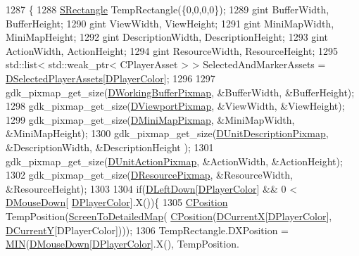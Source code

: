 \begin{DoxyCode}
1287                                      \{
1288     \hyperlink{structSRectangle}{SRectangle} TempRectangle(\{0,0,0,0\});
1289     gint BufferWidth, BufferHeight;
1290     gint ViewWidth, ViewHeight;
1291     gint MiniMapWidth, MiniMapHeight;
1292     gint DescriptionWidth, DescriptionHeight;
1293     gint ActionWidth, ActionHeight;
1294     gint ResourceWidth, ResourceHeight;
1295     std::list< std::weak\_ptr< CPlayerAsset > > SelectedAndMarkerAssets = 
      \hyperlink{classCApplicationData_a05c1087d5a5c4ddc14fcb37444f1642b}{DSelectedPlayerAssets}[\hyperlink{classCApplicationData_a53550939b20cba70570f113e4d1c5d02}{DPlayerColor}];
1296 
1297     gdk\_pixmap\_get\_size(\hyperlink{classCApplicationData_afa34cf2780f38dd28c0c811e69d60a97}{DWorkingBufferPixmap}, &BufferWidth, &BufferHeight); 
1298     gdk\_pixmap\_get\_size(\hyperlink{classCApplicationData_ac8801e116d0c49776c9f3db7415287fe}{DViewportPixmap}, &ViewWidth, &ViewHeight); 
1299     gdk\_pixmap\_get\_size(\hyperlink{classCApplicationData_abe3af81659ead5113b7b2f165a88e737}{DMiniMapPixmap}, &MiniMapWidth, &MiniMapHeight); 
1300     gdk\_pixmap\_get\_size(\hyperlink{classCApplicationData_a52e5c1a2ac452c82580ba3f4978c3501}{DUnitDescriptionPixmap}, &DescriptionWidth, &DescriptionHeight
      ); 
1301     gdk\_pixmap\_get\_size(\hyperlink{classCApplicationData_ae264356c833cd581093e3b373cce6620}{DUnitActionPixmap}, &ActionWidth, &ActionHeight); 
1302     gdk\_pixmap\_get\_size(\hyperlink{classCApplicationData_aa9faf270fb2d769855fa5d787a883a83}{DResourcePixmap}, &ResourceWidth, &ResourceHeight); 
1303     
1304     \textcolor{keywordflow}{if}(\hyperlink{classCApplicationData_a2b943f18557c3e4c8cd4550e22e028b6}{DLeftDown}[\hyperlink{classCApplicationData_a53550939b20cba70570f113e4d1c5d02}{DPlayerColor}] && 0 < \hyperlink{classCApplicationData_ad7a43a29e7906e44f09347850796a915}{DMouseDown}[
      \hyperlink{classCApplicationData_a53550939b20cba70570f113e4d1c5d02}{DPlayerColor}].X())\{
1305         \hyperlink{classCPosition}{CPosition} TempPosition(\hyperlink{classCApplicationData_a5c8b0ebf35fddb89b22f035544c32222}{ScreenToDetailedMap}(
      \hyperlink{classCPosition}{CPosition}(\hyperlink{classCApplicationData_a1dc7ee482a39f7978c71365ac540f97a}{DCurrentX}[\hyperlink{classCApplicationData_a53550939b20cba70570f113e4d1c5d02}{DPlayerColor}], \hyperlink{classCApplicationData_a0ba39779ae11c8072258c6ddfebd6052}{DCurrentY}[DPlayerColor])));
1306         TempRectangle.DXPosition = \hyperlink{main_8cpp_a3acffbd305ee72dcd4593c0d8af64a4f}{MIN}(\hyperlink{classCApplicationData_ad7a43a29e7906e44f09347850796a915}{DMouseDown}[\hyperlink{classCApplicationData_a53550939b20cba70570f113e4d1c5d02}{DPlayerColor}].X(), TempPosition.

\end{DoxyCode}
